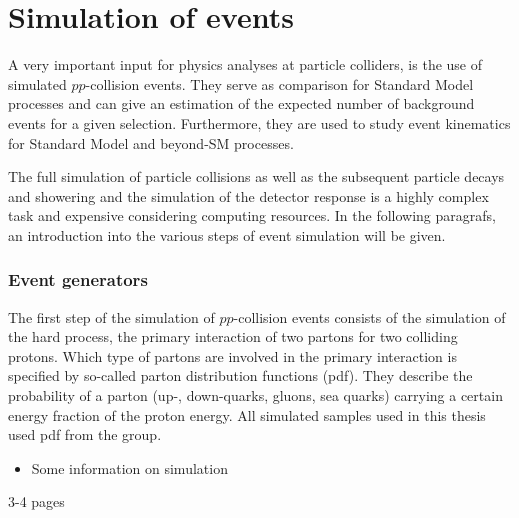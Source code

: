 \FloatBarrier
\chapter{Simulation of events}

A very important input for physics analyses at particle colliders, is the use of simulated $pp$-collision events.
They serve as comparison for Standard Model processes and can give an estimation of the expected number of background events for a given selection.
Furthermore, they are used to study event kinematics for Standard Model and beyond-SM processes.

The full simulation of particle collisions as well as the subsequent particle decays and showering and the simulation of the detector response is a highly complex task and expensive considering computing resources.
In the following paragrafs, an introduction into the various steps of event simulation will be given. 

\subsection{Event generators}
The first step of the simulation of $pp$-collision events consists of the simulation of the hard process, \ie the primary interaction of two partons for two colliding protons.
Which type of partons are involved in the primary interaction is specified by so-called parton distribution functions (pdf).
They describe the probability of a parton (up-, down-quarks, gluons, sea quarks) carrying a certain energy fraction of the proton energy.
All simulated samples used in this thesis used pdf from the \cteq group.
 


\begin{itemize}
\item Some information on simulation
\end{itemize}

3-4 pages
